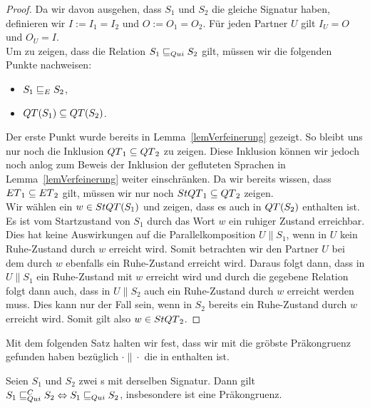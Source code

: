 \begin{proof}
  Da wir davon ausgehen, dass $S_1$ und $S_2$ die gleiche Signatur haben,
  definieren wir $I:=I_1=I_2$ und $O:=O_1=O_2$. Für jeden Partner $U$ gilt
  $I_U=O$ und $O_U=I$.\\
  Um zu zeigen, dass die Relation $S_1\sqsubseteq _{Qui} S_2$ gilt, müssen wir die
  folgenden Punkte nachweisen:
  \begin{itemize}
    \item $S_1\sqsubseteq _E S_2$,
    \item $QT{}(S_1)\subseteq QT{}(S_2)$.
  \end{itemize}
  Der erste Punkt wurde bereits in Lemma~\ref{lemVerfeinerung}
  gezeigt. So bleibt uns nur noch die Inklusion $QT{}_1\subseteq QT{}_2$ zu
  zeigen. Diese Inklusion können wir jedoch noch anlog zum Beweis der Inklusion
  der gefluteten Sprachen in Lemma~\ref{lemVerfeinerung} weiter einschränken.
  Da wir bereits wissen, dass $ET{}_1\subseteq ET{}_2$ gilt, müssen wir nur
  noch $StQT{}_1\subseteq QT{}_2$ zeigen.\\
  Wir wählen ein $w\in StQT{}(S_1)$ und zeigen, dass es auch in $QT{}(S_2)$
  enthalten ist.\\
  Es ist vom Startzustand von $S_1$ durch das Wort $w$ ein ruhiger Zustand
  erreichbar. Dies hat keine Auswirkungen auf die Parallelkomposition $U\|S_1$,
  wenn in $U$ kein Ruhe-Zustand durch $w$ erreicht wird. Somit betrachten wir
  den Partner $U$ bei dem durch $w$ ebenfalls ein Ruhe-Zustand erreicht wird.
  Daraus folgt dann, dass in $U\|S_1$ ein Ruhe-Zustand mit $w$ erreicht wird
  und durch die gegebene Relation folgt dann auch, dass in $U\|S_2$ auch ein
  Ruhe-Zustand durch $w$ erreicht werden muss. Dies kann nur der Fall sein,
  wenn in $S_2$ bereits ein Ruhe-Zustand durch $w$ erreicht wird. Somit gilt
  also $w\in StQT{}_2$.
\end{proof}

Mit dem folgenden Satz halten wir fest, dass wir mit \QRel{} die gröbste
Präkongruenz gefunden haben bezüglich $\cdot\|\cdot$ die in \QBRel{} enthalten
ist.

\begin{satz}
  \label{satzQuiFullAbst}
  Seien $S_1$ und $S_2$ zwei \EIO{}s mit derselben Signatur. Dann gilt
  $S_1\sqsubseteq _{Qui}^C S_2\Leftrightarrow S_1\sqsubseteq _{Qui} S_2$, insbesondere ist \QRel{} eine
  Präkongruenz.
\end{satz}

